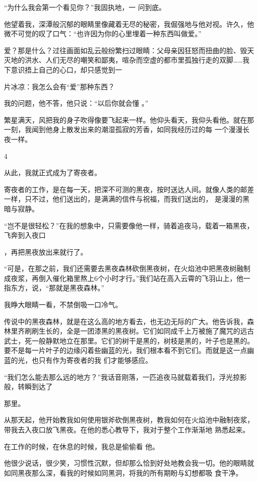 \documentclass{article}
\begin{document}
“为什么我会第一个看见你？”我固执地，一
问到底。 

他望着我，深潭般沉郁的眼睛里像藏着无尽的秘密，我倔强地与他对视。许久，他微不可觉的叹了口气：“也许因为你的心里埋着一种东西叫做爱。”

爱？那是什么？过往画面如乱云般纷繁扫过眼睛：父母亲因狂怒而扭曲的脸、毁天灭地的洪水、人们无尽的嘲笑和鄙夷，喧杂而空虚的都市里孤独行走的双脚……我下意识捂上自己的心口，却只感觉到一
\newpage

片冰凉：我怎么会有“爱”那种东西？ 

我的问题，他不答，他只说：“以后你就会懂
。” 

繁星满天，风把我的身子吹得像要飞起来一样。他仰头看天，我仰头看他。就在那一刻，我闻到他身上散发出来的潮湿孤寂的芳香，如同我经历过的每
一个漫漫长夜一样。 


4 


从此，我就正式成为了寄夜者。 

寄夜者的工作，是在每一天，把深不可测的黑夜，按时送达人间。就像人类的邮差一样，只不过，他们送出的，是满满的信件与祝福，而我们送出的，
是漫漫的黑暗与寂静。 

“岂不是很轻松？”在我的想象中，只需要像他一样，骑着追夜马，载着一箱黑夜，飞奔到入夜口
\newpage

，再把黑夜放出来就行了。 

“可是，在那之前，我们还需要去黑夜森林砍倒黑夜树，在火焰池中把黑夜树融制成夜浆，再倒入催化箱里熬上6个小时才行。”我们站在高入云霄的飞羽山上，他一指东方，说，“那就是黑夜森林。”


我睁大眼睛一看，不禁倒吸一口冷气。 

传说中的黑夜森林，就是在这么高的地方看去，也无边无际的广大。他告诉我，森林里齐刷刷生长的，全是一团漆黑的黑夜树。它们如同成千上万被施了魔咒的远古武士，死一般静默地立在那里。它们的树干是黑的，树枝是黑的，叶子也是黑的。要不是每一片叶子的边缘闪着些幽蓝的光，我们根本看不到它们。而就是这一点幽蓝的光，也只有作为寄夜者的我
们才能够感应。 

“我们怎么能去那么远的地方？”我话音刚落，一匹追夜马就载着我们，浮光掠影般，转瞬到达了

\newpage
那里。 

从那天起，他开始教我如何使用银斧砍倒黑夜树，教我如何在火焰池中融制夜浆，带我去入夜口放飞黑夜。在他的悉心教导下，我对于整个工作渐渐地
熟悉起来。 

在工作的时候，在休息的时候，我总是偷偷看
他。 

他很少说话，很少笑，习惯性沉默，但却那么恰到好处地教会我一切。他的眼睛就如同黑夜那么深，看我的时候如同黑洞，将我的所有期盼与幻想都吸
食干净。 
\end{document}

